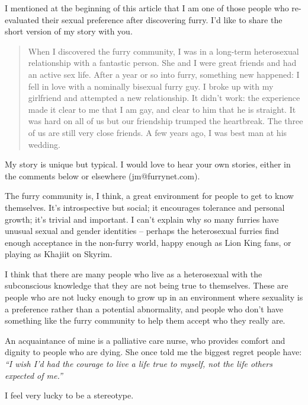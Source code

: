 I mentioned at the beginning of this article that I am one of those people who re-evaluated their sexual preference after discovering furry. I’d like to share the short version of my story with you.

\begin{quote}
  When I discovered the furry community, I was in a long-term heterosexual relationship with a fantastic person. She and I were great friends and had an active sex life. After a year or so into furry, something new happened: I fell in love with a nominally bisexual furry guy. I broke up with my girlfriend and attempted a new relationship. It didn’t work: the experience made it clear to me that I am gay, and clear to him that he is straight. It was hard on all of us but our friendship trumped the heartbreak. The three of us are still very close friends. A few years ago, I was best man at his wedding.
\end{quote}

My story is unique but typical. I would love to hear your own stories, either in the comments below or elsewhere (jm@furrynet.com).

The furry community is, I think, a great environment for people to get to know themselves. It’s introspective but social; it encourages tolerance and personal growth; it’s trivial and important. I can’t explain why so many furries have unusual sexual and gender identities -- perhaps the heterosexual furries find enough acceptance in the non-furry world, happy enough as Lion King fans, or playing as Khajiit on Skyrim.

I think that there are many people who live as a heterosexual with the subconscious knowledge that they are not being true to themselves. These are people who are not lucky enough to grow up in an environment where sexuality is a preference rather than a potential abnormality, and people who don’t have something like the furry community to help them accept who they really are.

An acquaintance of mine is a palliative care nurse, who provides comfort and dignity to people who are dying. She once told me the biggest regret people have: \textit{``I wish I’d had the courage to live a life true to myself, not the life others expected of me.''}

I feel very lucky to be a stereotype.
